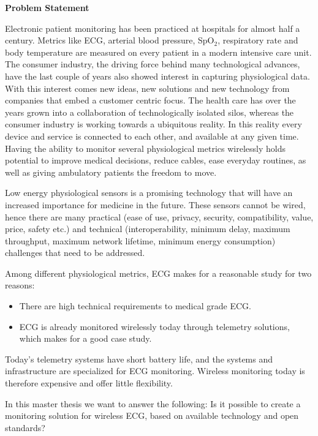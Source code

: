 \noindent
\textbf{Problem Statement} 
\newline 
	
\noindent 
Electronic patient monitoring has been practiced at hospitals for almost half a century. Metrics like ECG, arterial blood pressure, SpO$_2$, respiratory rate and body temperature are measured on every patient in a modern intensive care unit. The consumer industry, the driving force behind many technological advances, have the last couple of years also showed interest in capturing physiological data. With this interest comes new ideas, new solutions and new technology from companies that embed a customer centric focus. The health care has over the years grown into a collaboration of technologically isolated silos, whereas the consumer industry is working towards a ubiquitous reality. In this reality every device and service is connected to each other, and available at any given time. Having the ability to monitor several physiological metrics wirelessly holds potential to improve medical decisions, reduce cables, ease everyday routines, as well as giving ambulatory patients the freedom to move. 
	
	Low energy physiological sensors is a promising technology that will have an increased importance for medicine in the future. These sensors cannot be wired, hence there are many practical (ease of use, privacy, security, compatibility, value, price, safety etc.) and technical (interoperability, minimum delay, maximum throughput, maximum network lifetime, minimum energy consumption) challenges that need to be addressed.
	
	Among different physiological metrics, ECG makes for a reasonable study for two reasons: 
	\begin{itemize}
		\item There are high technical requirements to medical grade ECG. 
		\item ECG is already monitored wirelessly today through telemetry solutions, which makes for a good case study. 
	\end{itemize}

\noindent	
Today's telemetry systems have short battery life, and the systems and infrastructure are specialized for ECG monitoring. Wireless monitoring today is therefore expensive and offer little flexibility. 

In this master thesis we want to answer the following: Is it possible to create a monitoring solution for wireless ECG, based on available technology and open standards?